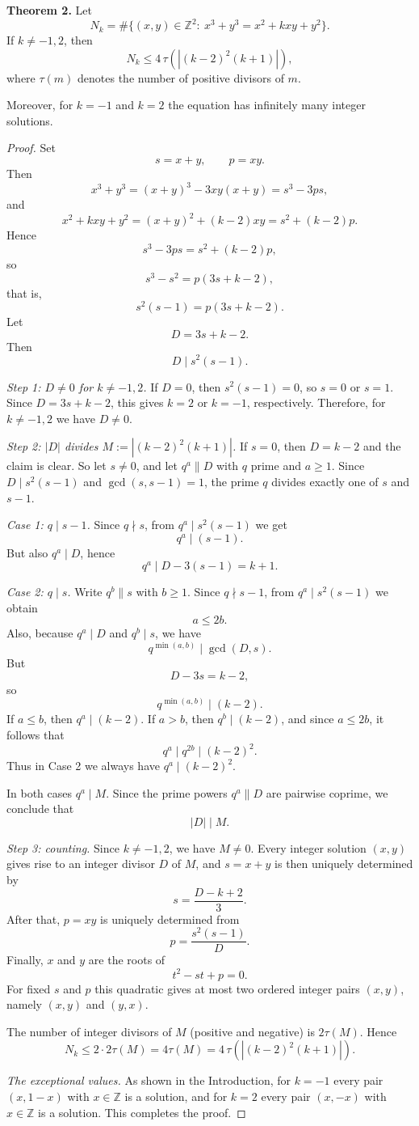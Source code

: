 \begin{thmbox}
\textbf{Theorem 2.} Let
\[
N_k=\#\{(x,y)\in \mathbb Z^2:\ x^3+y^3=x^2+kxy+y^2\}.
\]
If $k\neq -1,2$, then
\[
N_k\le 4\,\tau\!\left(\left|(k-2)^2(k+1)\right|\right),
\]
where $\tau(m)$ denotes the number of positive divisors of $m$.

Moreover, for $k=-1$ and $k=2$ the equation has infinitely many integer solutions.
\end{thmbox}

\begin{proof}
Set
\[
s=x+y,\qquad p=xy.
\]
Then
\[
x^3+y^3=(x+y)^3-3xy(x+y)=s^3-3ps,
\]
and
\[
x^2+kxy+y^2=(x+y)^2+(k-2)xy=s^2+(k-2)p.
\]
Hence
\[
s^3-3ps=s^2+(k-2)p,
\]
so
\[
s^3-s^2=p(3s+k-2),
\]
that is,
\[
s^2(s-1)=p(3s+k-2).
\]
Let
\[
D=3s+k-2.
\]
Then
\[
D\mid s^2(s-1).
\]

\medskip
\noindent\emph{Step 1: $D\neq 0$ for $k\ne -1,2$.} If $D=0$, then $s^2(s-1)=0$, so $s=0$ or $s=1$. Since $D=3s+k-2$, this gives $k=2$ or $k=-1$, respectively. Therefore, for $k\neq -1,2$ we have $D\neq 0$.

\medskip
\noindent\emph{Step 2: $|D|$ divides $M:=\left|(k-2)^2(k+1)\right|$.} If $s=0$, then $D=k-2$ and the claim is clear. So let $s\neq 0$, and let $q^a\parallel D$ with $q$ prime and $a\ge 1$. Since
$D\mid s^2(s-1)$ and $\gcd(s,s-1)=1$, the prime $q$ divides exactly one of $s$ and $s-1$.

\smallskip
\textit{Case 1: $q\mid s-1$.} Since $q\nmid s$, from $q^a\mid s^2(s-1)$ we get
\[
q^a\mid (s-1).
\]
But also $q^a\mid D$, hence
\[
q^a\mid D-3(s-1)=k+1.
\]

\smallskip
\textit{Case 2: $q\mid s$.} Write $q^b\parallel s$ with $b\ge 1$. Since $q\nmid s-1$, from $q^a\mid s^2(s-1)$ we obtain
\[
a\le 2b.
\]
Also, because $q^a\mid D$ and $q^b\mid s$, we have
\[
q^{\min(a,b)}\mid \gcd(D,s).
\]
But
\[
D-3s=k-2,
\]
so
\[
q^{\min(a,b)}\mid (k-2).
\]
If $a\le b$, then $q^a\mid (k-2)$. If $a>b$, then $q^b\mid (k-2)$, and since $a\le 2b$, it follows that
\[
q^a\mid q^{2b}\mid (k-2)^2.
\]
Thus in Case 2 we always have $q^a\mid (k-2)^2$.

\smallskip
In both cases $q^a\mid M$. Since the prime powers $q^a\parallel D$ are pairwise coprime, we conclude that
\[
|D|\mid M.
\]

\medskip
\noindent\emph{Step 3: counting.} Since $k\neq -1,2$, we have $M\neq 0$. Every integer solution $(x,y)$ gives rise to an integer divisor $D$ of $M$, and $s=x+y$ is then uniquely determined by
\[
s=\frac{D-k+2}{3}.
\]
After that, $p=xy$ is uniquely determined from
\[
p=\frac{s^2(s-1)}{D}.
\]
Finally, $x$ and $y$ are the roots of
\[
t^2-st+p=0.
\]
For fixed $s$ and $p$ this quadratic gives at most two ordered integer pairs $(x,y)$, namely $(x,y)$ and $(y,x)$.

The number of integer divisors of $M$ (positive and negative) is $2\tau(M)$. Hence
\[
N_k\le 2\cdot 2\tau(M)=4\tau(M)=4\,\tau\!\left(\left|(k-2)^2(k+1)\right|\right).
\]

\medskip
\noindent\emph{The exceptional values.} As shown in the Introduction, for $k=-1$ every pair $(x,1-x)$ with $x\in\mathbb Z$ is a solution, and for $k=2$ every pair $(x,-x)$ with $x\in\mathbb Z$ is a solution. This completes the proof.
\end{proof}
